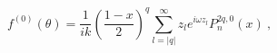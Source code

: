\begin{equation}
f^{(0)}(\theta)=\frac1{ik}\left(\frac{1-x}2\right)^q\sum_{l=|q|}^\infty
z_le^{i\omega z_l}P_n^{2q,0}(x) \ ,
\end{equation}

